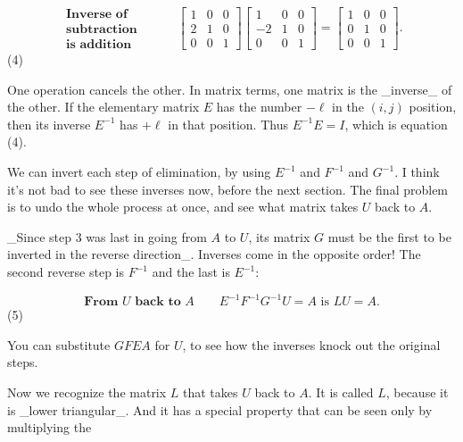 \[\begin{array}{ll}\textbf{Inverse of}&\\ \textbf{subtraction}&\\ \textbf{is addition}&\end{array}\qquad\begin{bmatrix}1&0&0\\ 2&1&0\\ 0&0&1\end{bmatrix}\begin{bmatrix}1&0&0\\ -2&1&0\\ 0&0&1\end{bmatrix}=\begin{bmatrix}1&0&0\\ 0&1&0\\ 0&0&1\end{bmatrix}.\] (4)

One operation cancels the other. In matrix terms, one matrix is the _inverse_ of the other. If the elementary matrix \(E\) has the number \(-\ell\) in the \((i,j)\) position, then its inverse \(E^{-1}\) has \(+\ell\) in that position. Thus \(E^{-1}E=I\), which is equation (4).

We can invert each step of elimination, by using \(E^{-1}\) and \(F^{-1}\) and \(G^{-1}\). I think it's not bad to see these inverses now, before the next section. The final problem is to undo the whole process at once, and see what matrix takes \(U\) back to \(A\).

_Since step 3 was last in going from \(A\) to \(U\), its matrix \(G\) must be the first to be inverted in the reverse direction_. Inverses come in the opposite order! The second reverse step is \(F^{-1}\) and the last is \(E^{-1}\):

\[\textbf{From }U\textbf{ back to }A\qquad E^{-1}F^{-1}G^{-1}U=A\text{ is }LU=A.\] (5)

You can substitute \(GFEA\) for \(U\), to see how the inverses knock out the original steps.

Now we recognize the matrix \(L\) that takes \(U\) back to \(A\). It is called \(L\), because it is _lower triangular_. And it has a special property that can be seen only by multiplying the 